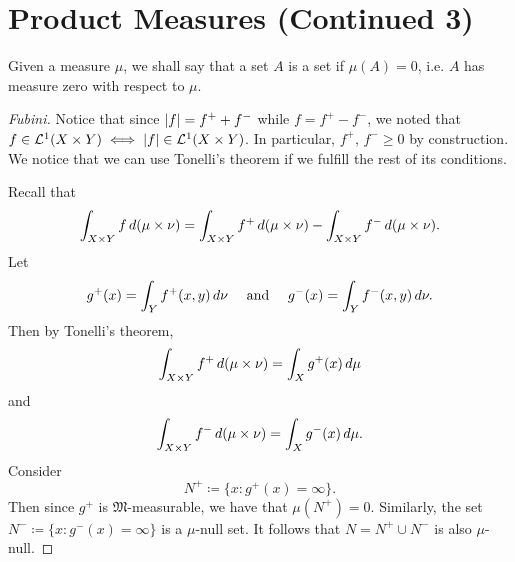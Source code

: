 \documentclass[notoc,notitlepage]{tufte-book}
\begin{document}
\section{Product Measures (Continued 3)}%
\label{sec:product_measures_continued_3}

\begin{note}
  Given a measure $\mu$, we shall say that a set $A$
  is a  set if $\mu(A) = 0$,
  i.e. $A$ has measure zero with respect to $\mu$.
\end{note}

\begin{proof}[Fubini]
  Notice that since $\left|f\right| = f^+ + f^-$ while
  $f = f^+ - f^-$, we noted that
  $f \in \mathcal{L}^1(X \times Y) \iff \left|f\right| \in \mathcal{L}^1(X \times Y)$.
  In particular, $f^+,\, f^- \geq 0$ by construction.
  We notice that we can use Tonelli's theorem
  if we fulfill the rest of its conditions.

  Recall that
  \begin{equation*}
    \int_{X \times Y} f \mathop{}\!d{(\mu \times \nu)}
    = \int_{X \times Y} f^+ \mathop{}\!d{(\mu \times \nu)}
      - \int_{X \times Y} f^- \mathop{}\!d{(\mu \times \nu)}.
  \end{equation*}
  Let
  \begin{equation*}
    g^+(x) = \int_Y f^+(x, y) \mathop{}\!d{\nu} \quad\text{ and }\quad
    g^-(x) = \int_Y f^-(x, y) \mathop{}\!d{\nu}.
  \end{equation*}
  Then by Tonelli's theorem,
  \begin{equation*}
    \int_{X \times Y} f^+ \mathop{}\!d{(\mu \times \nu)}
    = \int_X g^+(x) \mathop{}\!d{\mu}
  \end{equation*}
  and
  \begin{equation*}
    \int_{X \times Y} f^- \mathop{}\!d{(\mu \times \nu)}
    = \int_X g^-(x) \mathop{}\!d{\mu}.
  \end{equation*}
  Consider
  \begin{equation*}
    N^+ \coloneqq \{ x : g^+(x) = \infty \}.
  \end{equation*}
  Then since $g^+$ is $\mathfrak{M}$-measurable,
  we have that $\mu(N^+) = 0$.
  Similarly, the set $N^- \coloneqq \{ x : g^-(x) = \infty \}$
  is a $\mu$-null set.
  It follows that $N = N^+ \cup N^-$ is also $\mu$-null.


\end{proof}
\end{document}
